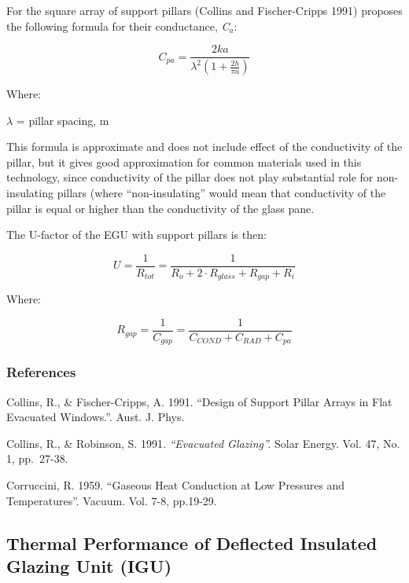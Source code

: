 For the square array of support pillars (Collins and Fischer-Cripps 1991) proposes the following formula for their conductance, \emph{C}\(_{a}\):

\begin{equation}
{C_{pa}} = \frac{{2ka}}{{{\lambda ^2}\left( {1 + \frac{{2h}}{{\pi a}}} \right)}}
\end{equation}

Where:

$\lambda$ = pillar spacing, m

This formula is approximate and does not include effect of the conductivity of the pillar, but it gives good approximation for common materials used in this technology, since conductivity of the pillar does not play substantial role for non-insulating pillars (where ``non-insulating'' would mean that conductivity of the pillar is equal or higher than the conductivity of the glass pane.

The U-factor of the EGU with support pillars is then:

\begin{equation}
U = \frac{1}{{{R_{tot}}}} = \frac{1}{{{R_o} + 2 \cdot {R_{glass}} + {R_{gap}} + {R_i}}}
\end{equation}

Where:

\begin{equation}
{R_{gap}} = \frac{1}{{{C_{gap}}}} = \frac{1}{{{C_{COND}} + {C_{RAD}} + {C_{pa}}}}
\end{equation}

\subsubsection{References}\label{references-055}

Collins, R., \& Fischer-Cripps, A. 1991. ``Design of Support Pillar Arrays in Flat Evacuated Windows.''. Aust. J. Phys.

Collins, R., \& Robinson, S. 1991. \emph{``Evacuated Glazing''.} Solar Energy. Vol. 47, No. 1, pp.~27-38.

Corruccini, R. 1959. ``Gaseous Heat Conduction at Low Pressures and Temperatures''. Vacuum. Vol. 7-8, pp.19-29.

\subsection{Thermal Performance of Deflected Insulated Glazing Unit (IGU)}\label{thermal-performance-of-deflected-insulated-glazing-unit-igu}

